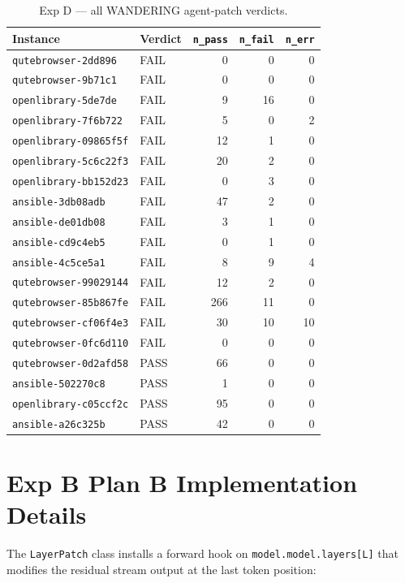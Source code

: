 \documentclass[11pt]{article}
\begin{document}
\begin{table}[h]
\centering
\small
\caption{Exp D --- all WANDERING agent-patch verdicts.}
\begin{tabular}{llrrr}
\toprule
Instance & Verdict & \texttt{n\_pass} & \texttt{n\_fail} & \texttt{n\_err} \\
\midrule
\texttt{qutebrowser-2dd896} & FAIL & 0 & 0 & 0 \\
\texttt{qutebrowser-9b71c1} & FAIL & 0 & 0 & 0 \\
\texttt{openlibrary-5de7de} & FAIL & 9 & 16 & 0 \\
\texttt{openlibrary-7f6b722} & FAIL & 5 & 0 & 2 \\
\texttt{openlibrary-09865f5f} & FAIL & 12 & 1 & 0 \\
\texttt{openlibrary-5c6c22f3} & FAIL & 20 & 2 & 0 \\
\texttt{openlibrary-bb152d23} & FAIL & 0 & 3 & 0 \\
\texttt{ansible-3db08adb} & FAIL & 47 & 2 & 0 \\
\texttt{ansible-de01db08} & FAIL & 3 & 1 & 0 \\
\texttt{ansible-cd9c4eb5} & FAIL & 0 & 1 & 0 \\
\texttt{ansible-4c5ce5a1} & FAIL & 8 & 9 & 4 \\
\texttt{qutebrowser-99029144} & FAIL & 12 & 2 & 0 \\
\texttt{qutebrowser-85b867fe} & FAIL & 266 & 11 & 0 \\
\texttt{qutebrowser-cf06f4e3} & FAIL & 30 & 10 & 10 \\
\texttt{qutebrowser-0fc6d110} & FAIL & 0 & 0 & 0 \\
\texttt{qutebrowser-0d2afd58} & PASS & 66 & 0 & 0 \\
\texttt{ansible-502270c8} & PASS & 1 & 0 & 0 \\
\texttt{openlibrary-c05ccf2c} & PASS & 95 & 0 & 0 \\
\texttt{ansible-a26c325b} & PASS & 42 & 0 & 0 \\
\bottomrule
\end{tabular}
\label{tab:exp_d_wandering_full}
\end{table}

\section{Exp B Plan B Implementation Details}\label{app:exp_b_implementation}

The \texttt{LayerPatch} class installs a forward hook on \texttt{model.model.layers[L]} that modifies the residual stream output at the last token position:
\end{document}
